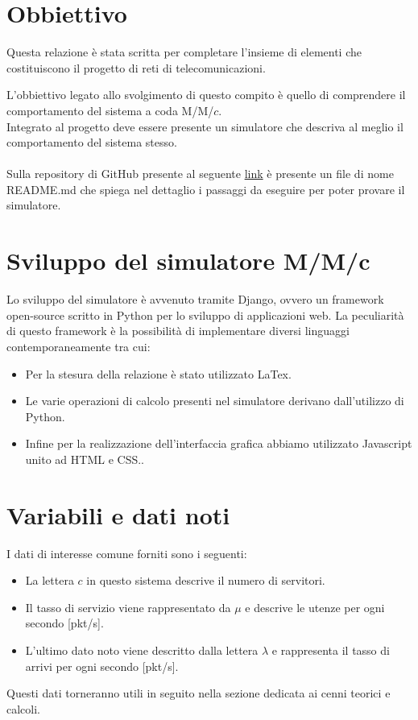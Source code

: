 \documentclass[12pt,a4paper]{article}
\begin{document}
\section{Obbiettivo}

    Questa relazione è stata scritta per completare l'insieme di elementi che costituiscono il progetto di reti di telecomunicazioni.
    
    L'obbiettivo legato allo svolgimento di questo compito è quello di comprendere il comportamento del sistema a coda M/M/$c$. \\ 
    Integrato al progetto deve essere presente un simulatore che descriva al meglio il comportamento del sistema stesso. \\ \\
    Sulla repository di GitHub presente al seguente \href{https://github.com/acuti03/progetto-reti}{link} è presente un file di nome README.md che spiega nel dettaglio i passaggi da eseguire per poter provare il simulatore.
    
\section{Sviluppo del simulatore M/M/c}
    Lo sviluppo del simulatore è avvenuto tramite Django, ovvero un framework open-source scritto in Python per lo sviluppo di applicazioni web. La peculiarità di questo framework è la possibilità di implementare diversi linguaggi contemporaneamente tra cui: 
    \begin{itemize}
        \item  Per la stesura della relazione è stato utilizzato LaTex.
        \item  Le varie operazioni di calcolo presenti nel simulatore derivano dall'utilizzo di Python. 
        \item  Infine per la realizzazione dell'interfaccia grafica abbiamo utilizzato Javascript unito ad HTML e CSS..
    \end{itemize}

\section{Variabili e dati noti}

I dati di interesse comune forniti sono i seguenti:
    
    \begin{itemize}
    \item La lettera $c$ in questo sistema descrive il numero di servitori.
    
    \item Il tasso di servizio viene rappresentato da $\mu$ e descrive le utenze per ogni secondo [pkt/s]. 
    
    \item L'ultimo dato noto viene descritto dalla lettera $\lambda$ e rappresenta il tasso di arrivi per ogni secondo [pkt/s].
    \end{itemize}
    Questi dati torneranno utili in seguito nella sezione dedicata ai cenni teorici e calcoli. \\
\newpage
\end{document}
